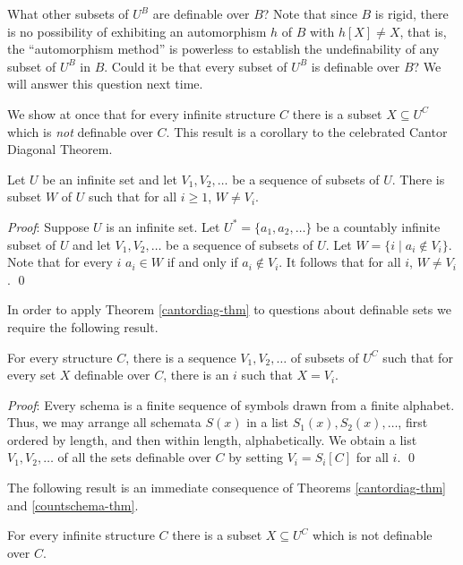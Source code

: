 What other subsets of $U^B$ are definable over $B$? Note that since $B$ is rigid, 
there is no possibility of exhibiting an automorphism $h$ of $B$ with $h[X]\neq X$, that is, the ``automorphism method'' is powerless to establish the undefinability of any subset of $U^B$ in $B$. Could it be that every subset of $U^B$ is definable over $B$? We will answer this question next time.

\iffalse
We show at once that for every infinite structure $C$ there is a subset $X\subseteq U^C$ which is \emph{not} definable over $C$. This result is a corollary to the celebrated Cantor Diagonal Theorem.
\begin{theorem}[Cantor]\label{cantordiag-thm}
Let $U$ be an infinite set and let $V_1, V_2, \ldots$ be a sequence of subsets of $U$. There is subset $W$ of $U$ such that for all $i\geq 1$, $W\neq V_i$.
\end{theorem}
\emph{Proof}: Suppose $U$ is an infinite set. Let $U^*= \{a_1, a_2, \ldots\}$ be a countably infinite subset of $U$ and let $V_1, V_2, \ldots$ be a sequence of subsets of $U$. Let $W=\{i\mid a_i\not\in V_i\}$. Note that for every $i$ $a_i\in W$ if and only if $a_i\not\in V_i$. It follows that for all $i$, $W\neq V_i$. \qed

In order to apply Theorem \ref{cantordiag-thm} to questions about definable sets we require the following result.
\begin{theorem}\label{countschema-thm}
For every structure $C$, there is a sequence $V_1,V_2,\ldots$ of subsets of $U^C$ such that for every set $X$ definable over $C$, there is an $i$ such that $X=V_i$. 
\end{theorem}
\emph{Proof}: Every schema is a finite sequence of symbols drawn from a finite alphabet. Thus, we may arrange all schemata $S(x)$ in a list $S_1(x), S_2(x),\ldots$, first ordered by length, and then within length, alphabetically. We obtain a list $V_1,V_2,\ldots $ of all the sets definable over $C$ by setting $V_i=S_i[C]$ for all $i$. \qed

The following result is an immediate consequence of  Theorems \ref{cantordiag-thm} and \ref{countschema-thm}.
\begin{corollary}
For every infinite structure $C$ there is a subset $X\subseteq U^C$ which is not definable over $C$.
\end{corollary}

